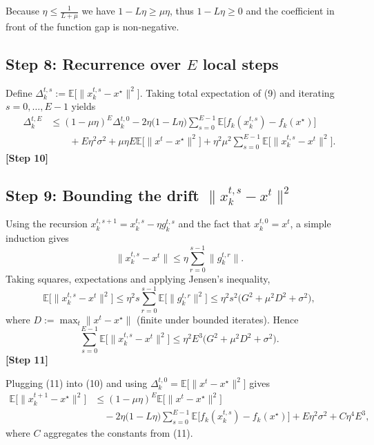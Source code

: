 \documentclass[11pt]{article}
\begin{document}
Because $\eta\le \frac{1}{L+\mu}$ we have $1-L\eta\ge \mu\eta$, thus $1-L\eta\ge0$ and the coefficient in front of the function gap is non‑negative.

\subsection*{Step 8: Recurrence over $E$ local steps}
Define $\Delta_{k}^{t,s}:=\mathbb{E}\!\bigl[\|x_{k}^{t,s}-x^{\star}\|^{2}\bigr]$.
Taking total expectation of (9) and iterating $s=0,\dots,E-1$ yields
\begin{align}
    \Delta_{k}^{t,E}
    &\le (1-\mu\eta)^{E}\Delta_{k}^{t,0}
       -2\eta\bigl(1-L\eta\bigr)\sum_{s=0}^{E-1}\mathbb{E}\!\bigl[f_k(x_{k}^{t,s})-f_k(x^{\star})\bigr]\nonumber\\
    &\qquad +E\eta^{2}\sigma^{2}
       +\mu\eta E\mathbb{E}\!\bigl[\|x^{t}-x^{\star}\|^{2}\bigr]
       +\eta^{2}\mu^{2}\sum_{s=0}^{E-1}\mathbb{E}\!\bigl[\|x_{k}^{t,s}-x^{t}\|^{2}\bigr]. \tag{10}
\end{align}
\textbf{[Step 10]}

\subsection*{Step 9: Bounding the drift $\|x_{k}^{t,s}-x^{t}\|^{2}$}
Using the recursion $x_{k}^{t,s+1}=x_{k}^{t,s}-\eta g_{k}^{t,s}$ and the fact that $x_{k}^{t,0}=x^{t}$, a simple induction gives
\[
    \|x_{k}^{t,s}-x^{t}\|\le \eta\sum_{r=0}^{s-1}\|g_{k}^{t,r}\|.
\]
Taking squares, expectations and applying Jensen’s inequality,
\[
    \mathbb{E}\!\bigl[\|x_{k}^{t,s}-x^{t}\|^{2}\bigr]
    \le \eta^{2}s\sum_{r=0}^{s-1}\mathbb{E}\!\bigl[\|g_{k}^{t,r}\|^{2}\bigr]
    \le \eta^{2}s^{2}\bigl(G^{2}+\mu^{2}D^{2}+\sigma^{2}\bigr),
\]
where $D:=\max_{t}\|x^{t}-x^{\star}\|$ (finite under bounded iterates). Hence
\[
    \sum_{s=0}^{E-1}\mathbb{E}\!\bigl[\|x_{k}^{t,s}-x^{t}\|^{2}\bigr]
    \le \eta^{2}E^{3}\bigl(G^{2}+\mu^{2}D^{2}+\sigma^{2}\bigr). \tag{11}
\]
\textbf{[Step 11]}

Plugging (11) into (10) and using $\Delta_{k}^{t,0}=\mathbb{E}\!\bigl[\|x^{t}-x^{\star}\|^{2}\bigr]$ gives
\begin{align}
    \mathbb{E}\!\bigl[\|x_{k}^{t+1}-x^{\star}\|^{2}\bigr]
    &\le (1-\mu\eta)^{E}\mathbb{E}\!\bigl[\|x^{t}-x^{\star}\|^{2}\bigr]\nonumber\\
    &\quad -2\eta\bigl(1-L\eta\bigr)\sum_{s=0}^{E-1}\mathbb{E}\!\bigl[f_k(x_{k}^{t,s})-f_k(x^{\star})\bigr]
    +E\eta^{2}\sigma^{2}+C\eta^{4}E^{3}, \tag{12}
\end{align}
where $C$ aggregates the constants from (11).
\end{document}

